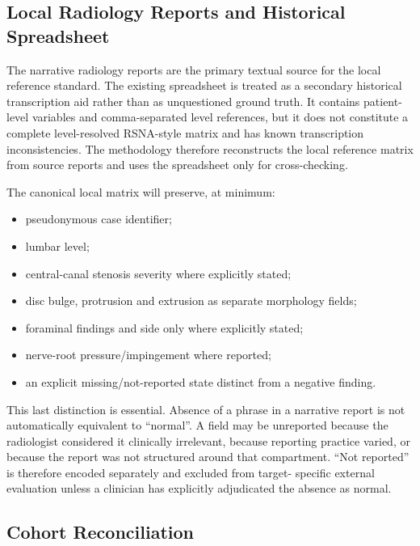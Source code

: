 \subsection{Local Radiology Reports and Historical Spreadsheet}
\label{sec:method-local-reports}

The narrative radiology reports are the primary textual source for the local
reference standard. The existing spreadsheet is treated as a secondary
historical transcription aid rather than as unquestioned ground truth. It
contains patient-level variables and comma-separated level references, but it
does not constitute a complete level-resolved RSNA-style matrix and has known
transcription inconsistencies. The methodology therefore reconstructs the local
reference matrix from source reports and uses the spreadsheet only for
cross-checking.

The canonical local matrix will preserve, at minimum:

\begin{itemize}
  \item pseudonymous case identifier;
  \item lumbar level;
  \item central-canal stenosis severity where explicitly stated;
  \item disc bulge, protrusion and extrusion as separate morphology fields;
  \item foraminal findings and side only where explicitly stated;
  \item nerve-root pressure/impingement where reported;
  \item an explicit missing/not-reported state distinct from a negative finding.
\end{itemize}

This last distinction is essential. Absence of a phrase in a narrative report is
not automatically equivalent to ``normal''. A field may be unreported because
the radiologist considered it clinically irrelevant, because reporting practice
varied, or because the report was not structured around that compartment.
``Not reported'' is therefore encoded separately and excluded from target-
specific external evaluation unless a clinician has explicitly adjudicated the
absence as normal.

\subsection{Cohort Reconciliation}
\label{sec:method-reconciliation}

